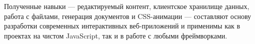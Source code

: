 Полученные навыки --- редактируемый контент, клиентское хранилище данных,
работа с файлами, генерация документов и CSS-анимации --- составляют основу
разработки современных интерактивных веб-приложений и применимы как в
проектах на чистом JavaScript, так и в работе с любыми фреймворками.

\endinput
